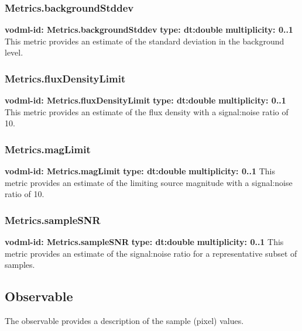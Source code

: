     \subsubsection{Metrics.backgroundStddev}
      \textbf{vodml-id: Metrics.backgroundStddev} \newline
      \textbf{type: dt:double} \newline
      \textbf{multiplicity: 0..1} \newline
      This metric provides an estimate of the standard deviation in the background level.

    \subsubsection{Metrics.fluxDensityLimit}
      \textbf{vodml-id: Metrics.fluxDensityLimit} \newline
      \textbf{type: dt:double} \newline
      \textbf{multiplicity: 0..1} \newline
      This metric provides an estimate of the flux density with a signal:noise ratio of 10.

    \subsubsection{Metrics.magLimit}
      \textbf{vodml-id: Metrics.magLimit} \newline
      \textbf{type: dt:double} \newline
      \textbf{multiplicity: 0..1} \newline
      This metric provides an estimate of the limiting source magnitude with a signal:noise ratio of 10.

    \subsubsection{Metrics.sampleSNR}
      \textbf{vodml-id: Metrics.sampleSNR} \newline
      \textbf{type: dt:double} \newline
      \textbf{multiplicity: 0..1} \newline
      This metric provides an estimate of the signal:noise ratio for a representative subset of samples.

  \subsection{Observable}
  \label{sect:Observable}
    The observable provides a description of the sample (pixel) values.

